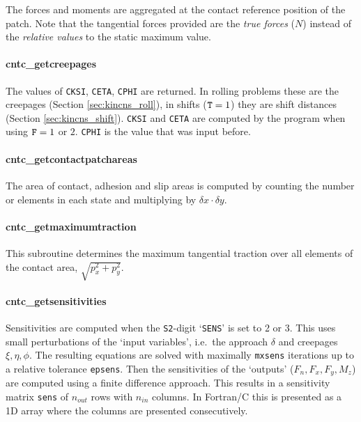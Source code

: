 \documentclass[12pt]{report}
\begin{document}
The forces and moments are aggregated at the contact reference position of
the patch.  Note that the tangential forces provided are the {\em true
forces\/} ($N$) instead of the {\em relative values\/} to the static
maximum value.

\paragraph{cntc\_getcreepages}

The values of {\tt CKSI}, {\tt CETA}, {\tt CPHI} are returned. In rolling
problems these are the creepages (Section \ref{sec:kincns_roll}), in shifts
(${\tt T}=1$) they are shift distances (Section \ref{sec:kincns_shift}).
{\tt CKSI} and {\tt CETA} are computed by the program when using ${\tt
F}=1$ or $2$. {\tt CPHI} is the value that was input before.

\paragraph{cntc\_getcontactpatchareas}

The area of contact, adhesion and slip areas is computed by counting the
number or elements in each state and multiplying by $\delta x\cdot \delta
y$.

\paragraph{cntc\_getmaximumtraction}

This subroutine determines the maximum tangential traction
over all elements of the contact area, $\sqrt{p_x^2+p_y^2}$.

\paragraph{cntc\_getsensitivities}

Sensitivities are computed when the {\tt S2}-digit `{\tt SENS}' is set to
2 or 3. This uses small perturbations of the `input variables', i.e.\ the
approach $\delta$ and creepages $\xi, \eta, \phi$. The resulting equations are
solved with maximally {\tt mxsens} iterations up to a relative tolerance
{\tt epsens}. Then the sensitivities of the `outputs' ($F_n, F_x, F_y,
M_z$) are computed using a finite difference approach. This results in a
sensitivity matrix {\tt sens} of $n_{out}$ rows with $n_{in}$ columns. In
Fortran/C this is presented as a 1D array where the columns are presented
consecutively.
\end{document}
